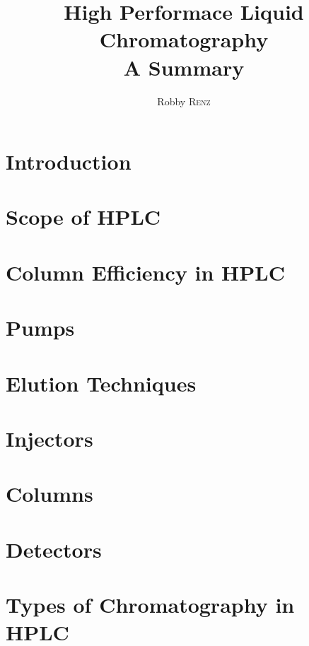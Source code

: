 \documentclass[a4paper, 12pt]{article}
\author{Robby \textsc{Renz}}
\title{\textbf{High Performace Liquid Chromatography} \\ A Summary}
\begin{document}
\maketitle
\newpage

\tableofcontents
\listoffigures
\listoftables
\newpage

\section{Introduction}


\section{Scope of HPLC}


\section{Column Efficiency in HPLC}


\section{Pumps}


\section{Elution Techniques}


\section{Injectors}


\section{Columns}


\section{Detectors}


\section{Types of Chromatography in HPLC}
\end{document}
